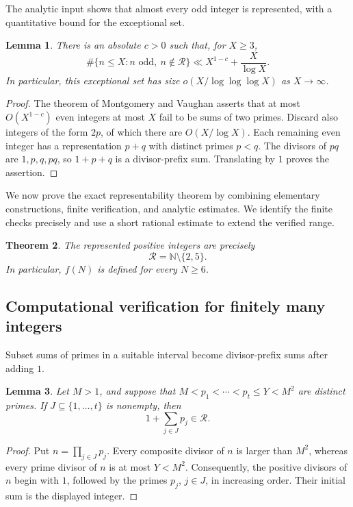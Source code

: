 \documentclass[11pt,letterpaper,reqno]{amsart}
\numberwithin{equation}{section}
\newtheorem{theorem}{Theorem}[section]
\newtheorem{lemma}[theorem]{Lemma}
\theoremstyle{remark}
\newcommand{\N}{\mathbb{N}}
\newcommand{\Rcal}{\mathcal{R}}
\newcommand{\1}{\mathbf 1}
\renewcommand{\leq}{\leqslant}
\renewcommand{\geq}{\geqslant}
\begin{document}
The analytic input shows that almost every odd integer is represented, with a quantitative bound for the exceptional set.

\begin{lemma}
\label{lem:analytic-odd-representability}
There is an absolute $c>0$ such that, for $X\geq3$,
\[
 \#\{n\leq X:n\text{ odd},\ n\notin\Rcal\}
 \ll X^{1-c}+\frac{X}{\log X}.
\]
In particular, this exceptional set has size
$o(X/\log\log\log X)$ as $X\to\infty$.
\end{lemma}

\begin{proof}
The theorem of Montgomery and Vaughan \cite{MVGoldbach}
asserts that at most $O(X^{1-c})$ even integers at most $X$ fail to
be sums of two primes. Discard also integers of the form $2p$, of
which there are $O(X/\log X)$. Each remaining even integer has a
representation $p+q$ with distinct primes $p<q$. The divisors of
$pq$ are $1,p,q,pq$, so $1+p+q$ is a divisor-prefix sum. Translating
by $1$ proves the assertion.
\end{proof}

We now prove the exact representability theorem by combining elementary
constructions, finite verification, and analytic estimates. We identify the
finite checks precisely and use a short rational estimate to extend the
verified range.

\begin{theorem}
\label{thm:fraiture-representability}
The represented positive integers are precisely
\[
 \Rcal=\N\setminus\{2,5\}.
\]
In particular, $f(N)$ is defined for every $N\geq6$.
\end{theorem}

\subsection{Computational verification for finitely many integers}

Subset sums of primes in a suitable interval become divisor-prefix sums after adding $1$.

\begin{lemma}
\label{lem:fraiture-prime-window}
Let $M>1$, and suppose that
$M<p_1<\cdots<p_t\leq Y<M^2$ are distinct primes. If
$J\subseteq\{1,\ldots,t\}$ is nonempty, then
\[
 1+\sum_{j\in J}p_j\in\Rcal.
\]
\end{lemma}

\begin{proof}
Put $n=\prod_{j\in J}p_j$. Every composite divisor of $n$ is larger than
$M^2$, whereas every prime divisor of $n$ is at most $Y<M^2$.
Consequently, the positive divisors of $n$ begin with $1$, followed by the
primes $p_j$, $j\in J$, in increasing order. Their initial sum is the
displayed integer.
\end{proof}
\end{document}
